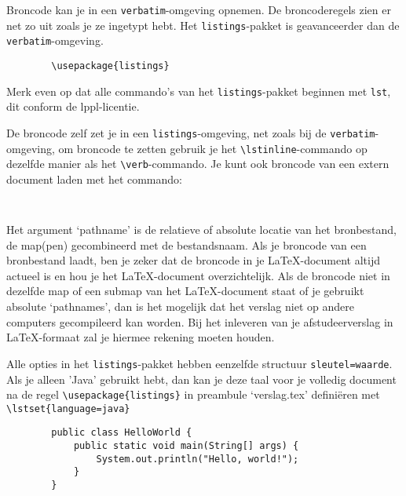Broncode kan je in een \verb!verbatim!-omgeving opnemen. De
broncoderegels zien er net zo uit zoals je ze ingetypt hebt.  Het
\verb!listings!-pakket is geavanceerder dan de
\verb!verbatim!-omgeving.

\begin{Aanpassen}
	\begin{verbatim}
		\usepackage{listings}
	\end{verbatim}
\end{Aanpassen}

Merk even op dat alle commando's van het \verb!listings!-pakket
beginnen met \verb!lst!, dit conform de lppl-licentie.

De broncode zelf zet je in een \verb!listings!-omgeving, net zoals bij
de \verb!verbatim!-omgeving, om broncode te zetten gebruik je het
\verb!\lstinline!-commando op dezelfde manier als het
\verb!\verb!-commando. Je kunt ook broncode van een extern document laden met het commando:

\begin{Aanpassen}
	\begin{verbatim}
		
	\end{verbatim}
\end{Aanpassen}

Het argument `pathname' is de relatieve of absolute locatie van het
bronbestand, de map(pen) gecombineerd met de bestandsnaam. Als je
broncode van een bronbestand laadt, ben je zeker dat de broncode in je
\LaTeX{}-document altijd actueel is en hou je het \LaTeX{}-document
overzichtelijk. Als de broncode niet in dezelfde map of een submap van
het \LaTeX{}-document staat of je gebruikt absolute `pathnames', dan
is het mogelijk dat het verslag niet op andere computers gecompileerd
kan worden. Bij het inleveren van je afstudeerverslag in
\LaTeX{}-formaat zal je hiermee rekening moeten houden.


Alle opties in het \verb!listings!-pakket hebben eenzelfde structuur
\verb!sleutel=waarde!. Als je alleen 'Java' gebruikt hebt, dan kan je
deze taal voor je volledig document na de regel
\verb!\usepackage{listings}! in preambule `verslag.tex' definiëren met
\verb!\lstset{language=java}!

\lstset{language=java}

\begin{Aanpassen}
	\begin{lstlisting}
		public class HelloWorld {
			public static void main(String[] args) {
				System.out.println("Hello, world!");
			}
		}
	\end{lstlisting}
\end{Aanpassen}


